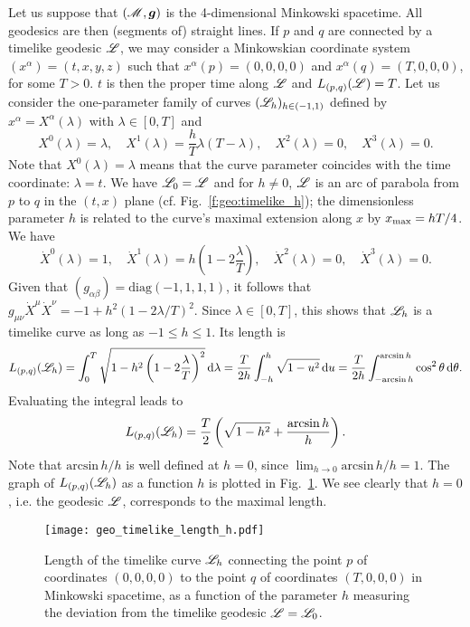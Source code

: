 \begin{example} \label{x:geo:timelike_geod_Mink}
Let us suppose that $(\mathscr{M},\bm{g})$ is the 4-dimensional Minkowski spacetime.
All geodesics are then (segments of) straight lines. If $p$ and $q$ are
connected by a timelike geodesic $\mathscr{L}$,
we may consider a Minkowskian coordinate system $(x^\alpha)=(t,x,y,z)$
such that $x^\alpha(p) = (0,0,0,0)$ and $x^\alpha(q) = (T,0,0,0)$, for some $T>0$.
$t$ is then the proper time along $\mathscr{L}$ and
$L_{(p,q)}(\mathscr{L})=T$. Let us consider the one-parameter family of curves
$(\mathscr{L}_h)_{h\in(-1,1)}$ defined by $x^\alpha = X^\alpha(\lambda)$ with
$\lambda\in[0,T]$ and
\[
   X^0(\lambda) = \lambda, \quad
   X^1(\lambda) = \frac{h}{T} \lambda(T - \lambda),\quad
   X^2(\lambda) = 0, \quad
   X^3(\lambda) = 0 .
\]
Note that $X^0(\lambda) = \lambda$ means that the curve parameter
coincides with the time coordinate: $\lambda = t$.
We have $\mathscr{L}_0 = \mathscr{L}$ and for $h\not=0$, $\mathscr{L}$ is
an arc of parabola from $p$ to $q$ in the $(t,x)$ plane
(cf. Fig.~\ref{f:geo:timelike_h}); the dimensionless
parameter $h$ is related to the curve's maximal extension along $x$ by
$x_{\rm max} = h T /4$. We have
\[
   \dot{X}^0(\lambda) = 1, \quad
   \dot{X}^1(\lambda) = h \left( 1 - 2\frac{\lambda}{T} \right),\quad
   \dot{X}^2(\lambda) = 0, \quad
   \dot{X}^3(\lambda) = 0 .
\]
Given that $(g_{\alpha\beta}) = \mathrm{diag}(-1,1,1,1)$, it follows that
$g_{\mu\nu} \dot{X}^\mu \dot{X}^\nu = -1 + h^2(1-2\lambda/T)^2$.
Since $\lambda\in[0,T]$, this shows that $\mathscr{L}_h$ is a timelike
curve as long as $-1\leq h \leq 1$. Its length is
\[
L_{(p,q)}(\mathscr{L}_h) = \int_{0}^{T} \sqrt{ 1 - h^2 \left( 1 - 2\frac{\lambda}{T} \right)^2 }
    \, \mathrm{d}\lambda  = \frac{T}{2h} \int_{-h}^h \sqrt{1 - u^2} \, \mathrm{d} u
    = \frac{T}{2h} \int_{-\mathrm{arcsin}\, h}^{\mathrm{arcsin}\, h}
        \cos^2 \theta \, \mathrm{d} \theta .
\]
Evaluating the integral leads to
\[
    L_{(p,q)}(\mathscr{L}_h) = \frac{T}{2} \left( \sqrt{1-h^2} + \frac{\mathrm{arcsin}\, h}{h} \right) .
\]
Note that $\mathrm{arcsin}\, h/h$ is well defined at $h=0$, since
$\lim_{h\rightarrow 0}  \mathrm{arcsin}\, h/h = 1$.
The graph of $L_{(p,q)}(\mathscr{L}_h)$ as a function $h$ is plotted in
Fig.~\ref{f:geo:timelike_length_h}. We see clearly that $h=0$, i.e. the
geodesic $\mathscr{L}$, corresponds to the maximal length.
\end{example}

\begin{figure}
\centerline{\texttt{[image: geo\_timelike\_length\_h.pdf]}}
\caption[]{\label{f:geo:timelike_length_h} \footnotesize
Length of the timelike curve $\mathscr{L}_h$ connecting the point $p$
of coordinates $(0,0,0,0)$ to the point $q$ of coordinates $(T,0,0,0)$
in Minkowski spacetime, as a function of the parameter $h$ measuring
the deviation from the timelike geodesic $\mathscr{L}=\mathscr{L}_0$.}
\end{figure}



